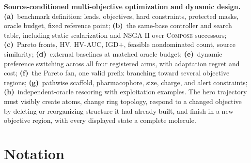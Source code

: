 \documentclass{article}
\newcommand{\method}{\textsc{Compose}\xspace}
\theoremstyle{definition}
\theoremstyle{remark}
\begin{document}
\textbf{Source-conditioned multi-objective optimization and dynamic design.} \textbf{(a)}~benchmark definition: leads, objectives, hard constraints, protected masks, oracle budget, fixed reference point; \textbf{(b)}~the same-base controller and search table, including static scalarization and NSGA-II over \method successors; \textbf{(c)}~Pareto fronts, HV, HV-AUC, IGD$+$, feasible nondominated count, source similarity; \textbf{(d)}~external baselines at matched oracle budget; \textbf{(e)}~dynamic preference switching across all four registered arms, with adaptation regret and cost; \textbf{(f)}~the Pareto fan, one valid prefix branching toward several objective regions; \textbf{(g)}~pathwise scaffold, pharmacophore, size, charge, and alert constraints; \textbf{(h)}~independent-oracle rescoring with exploitation examples. The hero trajectory must visibly create atoms, change ring topology, respond to a changed objective by deleting or reorganizing structure it had already built, and finish in a new objective region, with every displayed state a complete molecule.

\section{Notation}\label{app:notation}
\end{document}
